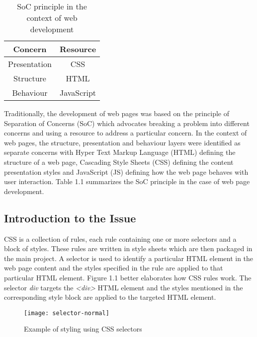 \documentclass[12pt]{article}
\begin{document}
\vspace{0.5cm}

\begin{table}[h]
	\centering
	\begin{tabular}{|c|c|}
		\hline
		\textbf{Concern} & \textbf{Resource} \\ 
		\hline
		Presentation & CSS \\
		\hline 
		Structure & HTML \\
		\hline
		Behaviour & JavaScript \\
		\hline
	\end{tabular}
	\caption{SoC principle in the context of web development}
\end{table}

\vspace{0.5cm}

Traditionally, the development of web pages was based on the principle of Separation of Concerns (SoC) which advocates breaking a problem into different concerns and using a resource to address a particular concern. In the context of web pages, the structure, presentation and behaviour layers were identified as separate concerns with Hyper Text Markup Language (HTML) defining the structure of a web page, Cascading Style Sheets (CSS) defining the content presentation styles and JavaScript (JS) defining how the web page behaves with user interaction. Table 1.1 summarizes the SoC principle in the case of web page development.

\subsection{Introduction to the Issue}
CSS is a collection of rules, each rule containing one or more selectors and a block of styles. These rules are written in style sheets which are then packaged in the main project. A selector is used to identify a particular HTML element in the web page content and the styles specified in the rule are applied to that particular HTML element. Figure 1.1 better elaborates how CSS rules work. The selector \textit{div} targets the \textit{<div>} HTML element and the styles mentioned in the corresponding style block are applied to the targeted HTML element.

\vspace{0.5cm}

\begin{figure}[h]
\texttt{[image: selector-normal]}
\centering
\caption{Example of styling using CSS selectors}
\end{figure}
\end{document}
